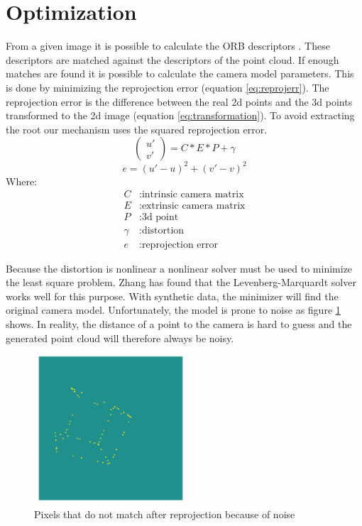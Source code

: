 \documentclass[conference,nofonttune]{IEEEtran}
\begin{document}
\section{Optimization}
From a given image it is possible to calculate the ORB descriptors \cite{orbslam}. These descriptors are matched against the descriptors of the point cloud. If enough matches are found it is possible to calculate the camera model parameters. This is done by minimizing the reprojection error (equation \ref{eq:reprojerr}). The reprojection error is the difference between the real 2d points and the 3d points transformed to the 2d image (equation \ref{eq:transformation}). To avoid extracting the root our mechanism uses the squared reprojection error.\\
\scriptsize
\begin{equation}\label{eq:transformation}
\begin{pmatrix}u'\\v'\end{pmatrix}=C*E*P+\gamma
\end{equation}
\begin{equation}\label{eq:reprojerr}
e=(u'-u)^2+(v'-v)^2
\end{equation}
\normalsize
Where:
\begin{align*}
  C		&: \text{intrinsic camera matrix}\\
  E	    	&: \text{extrinsic camera matrix}\\
  P		&: \text{3d point}\\
  \gamma   	&: \text{distortion}\\
  e		&: \text{reprojection error}
\end{align*}

Because the distortion is nonlinear a nonlinear solver must be used to minimize the least square problem. Zhang \cite{Zhang} has found that the Levenberg-Marquardt solver works well for this purpose. With synthetic data, the minimizer will find the original camera model. Unfortunately, the model is prone to noise as figure \ref{fig:reprojerr} shows. In reality, the distance of a point to the camera is hard to guess and the generated point cloud will therefore always be noisy.

\begin{figure}
\includegraphics[width=0.5\textwidth]{img/reprojection_error.png}
\caption{Pixels that do not match after reprojection because of noise}\label{fig:reprojerr}
\end{figure}
\end{document}
